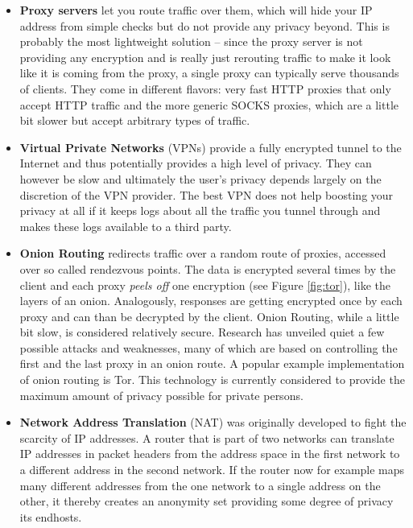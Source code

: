 \documentclass{acm_proc_article-sp}
\begin{document}
\begin{itemize}
\item \textbf{Proxy servers} let you route traffic over them, which will hide your IP address from simple checks but do not provide any privacy beyond. This is probably the most lightweight solution -- since the proxy server is not providing any encryption and is really just rerouting traffic to make it look like it is coming from the proxy, a single proxy can typically serve thousands of clients. They come in different flavors: very fast HTTP proxies that only accept HTTP traffic and the more generic SOCKS proxies, which are a little bit slower but accept arbitrary types of traffic.
\item \textbf{Virtual Private Networks} (VPNs) provide a fully encrypted tunnel to the Internet and thus potentially provides a high level of privacy. They can however be slow and ultimately the user's privacy depends largely on the discretion of the VPN provider. The best VPN does not help boosting your privacy at all if it keeps logs about all the traffic you tunnel through and makes these logs available to a third party. 
\item \textbf{Onion Routing} redirects traffic over a random route of proxies, accessed over so called rendezvous points. The data is encrypted several times by the client and each proxy \emph{peels off} one encryption (see Figure \ref{fig:tor}), like the layers of an onion. Analogously, responses are getting encrypted once by each proxy and can than be decrypted by the client. Onion Routing, while a little bit slow, is considered relatively secure. Research has unveiled quiet a few possible attacks and weaknesses, many of which are based on controlling the first and the last proxy in an onion route. A popular example implementation of onion routing is Tor. This technology is currently considered to provide the maximum amount of privacy possible for private persons.
\item \textbf{Network Address Translation} (NAT) was originally developed to fight the scarcity of IP addresses. A router that is part of two networks can translate IP addresses in packet headers from the address space in the first network to a different address in the second network. If the router now for example maps many different addresses from the one network to a single address on the other, it thereby creates an anonymity set providing some degree of privacy its endhosts.
\end{itemize}
\end{document}
